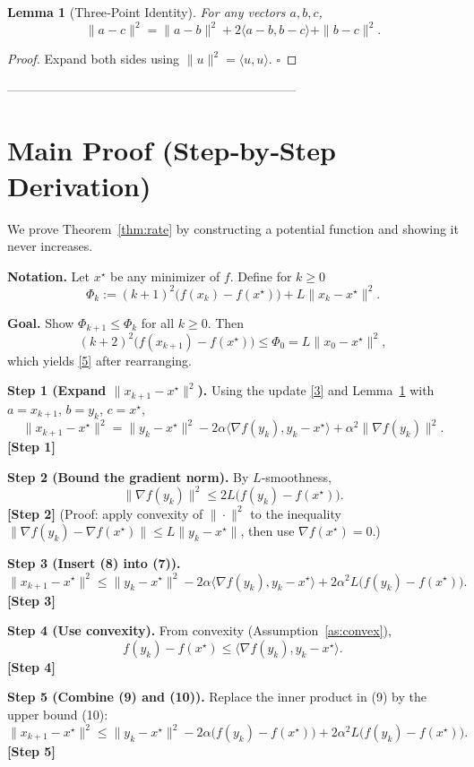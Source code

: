 \documentclass{article}
\newtheorem{lemma}{Lemma}
\newcommand{\grad}{\nabla}
\begin{document}
\begin{lemma}[Three‑Point Identity]\label{lem:three}
For any vectors $a,b,c$,
\[
\|a-c\|^2 = \|a-b\|^2 + 2\langle a-b, b-c\rangle + \|b-c\|^2 .
\]
\end{lemma}
\begin{proof}
Expand both sides using $\|u\|^2=\langle u,u\rangle$. \hfill $\square$
\end{proof}

---------------------------------------------------------------------

\section*{Main Proof (Step‑by‑Step Derivation)}
We prove Theorem~\ref{thm:rate} by constructing a potential function and showing it never increases.

\noindent\textbf{Notation.} Let $x^\star$ be any minimizer of $f$. Define for $k\ge 0$
\[
\Phi_k := (k+1)^2\bigl(f(x_k)-f(x^\star)\bigr)+L\|x_k-x^\star\|^2 .
\tag{6}
\]

\noindent\textbf{Goal.} Show $\Phi_{k+1}\le \Phi_k$ for all $k\ge 0$. Then
\[
(k+2)^2\bigl(f(x_{k+1})-f(x^\star)\bigr)\le \Phi_0
= L\|x_0-x^\star\|^2,
\]
which yields \eqref{5} after rearranging.

\bigskip

\noindent\textbf{Step 1 (Expand $\|x_{k+1}-x^\star\|^2$).} Using the update \eqref{3} and Lemma~\ref{lem:three} with $a=x_{k+1}$, $b=y_k$, $c=x^\star$,
\[
\|x_{k+1}-x^\star\|^2
= \|y_k-x^\star\|^2 -2\alpha\langle\grad f(y_k),y_k-x^\star\rangle
+ \alpha^2\|\grad f(y_k)\|^2 .
\tag{7}
\]
\textbf{[Step 1]}

\noindent\textbf{Step 2 (Bound the gradient norm).} By $L$‑smoothness,
\[
\|\grad f(y_k)\|^2
\le 2L\bigl(f(y_k)-f(x^\star)\bigr) .
\tag{8}
\]
\textbf{[Step 2]} (Proof: apply convexity of $\|\cdot\|^2$ to the inequality $\|\grad f(y_k)-\grad f(x^\star)\|\le L\|y_k-x^\star\|$, then use $\grad f(x^\star)=0$.)

\noindent\textbf{Step 3 (Insert (8) into (7)).}
\[
\|x_{k+1}-x^\star\|^2
\le \|y_k-x^\star\|^2 -2\alpha\langle\grad f(y_k),y_k-x^\star\rangle
+2\alpha^2 L\bigl(f(y_k)-f(x^\star)\bigr) .
\tag{9}
\]
\textbf{[Step 3]}

\noindent\textbf{Step 4 (Use convexity).} From convexity (Assumption~\ref{as:convex}),
\[
f(y_k)-f(x^\star)\le \langle\grad f(y_k),y_k-x^\star\rangle .
\tag{10}
\]
\textbf{[Step 4]}

\noindent\textbf{Step 5 (Combine (9) and (10)).} Replace the inner product in (9) by the upper bound (10):
\[
\|x_{k+1}-x^\star\|^2
\le \|y_k-x^\star\|^2 -2\alpha\bigl(f(y_k)-f(x^\star)\bigr)
+2\alpha^2 L\bigl(f(y_k)-f(x^\star)\bigr) .
\tag{11}
\]
\textbf{[Step 5]}
\end{document}
